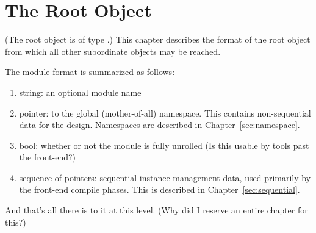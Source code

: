 
\chapter{The Root Object}
\label{sec:root}

(The root object is of type .)
This chapter describes the format of the root object from which
all other subordinate objects may be reached.  

The module format is summarized as follows:

\begin{enumerate}
\item string: an optional module name
\item pointer: to the global (mother-of-all) namespace.
	This contains non-sequential data for the design.  
	Namespaces are described in Chapter~\ref{sec:namespace}.  
\item bool: whether or not the module is fully unrolled
	(Is this usable by tools past the front-end?)
\item sequence of pointers: sequential instance management data, 
	used primarily by the front-end compile phases.  
	This is described in Chapter~\ref{sec:sequential}.  
\end{enumerate}

And that's all there is to it at this level.  
(Why did I reserve an entire chapter for this?)

